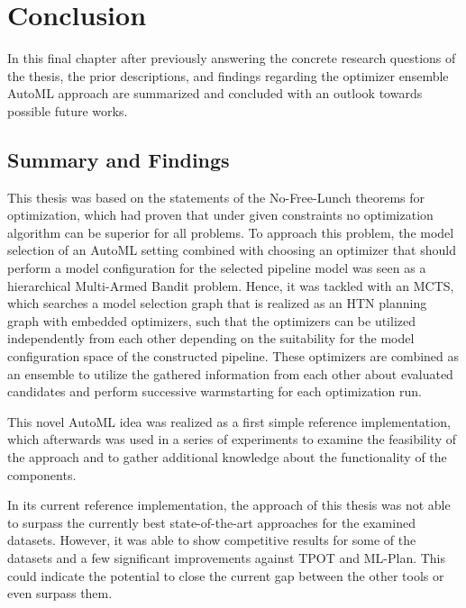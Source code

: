 %
\chapter{Conclusion}
\label{sec:conclusion}
In this final chapter after previously answering the concrete research questions of the thesis, the prior descriptions, and findings regarding the optimizer ensemble AutoML approach are summarized and concluded with an outlook towards possible future works.

\section{Summary and Findings}
\label{sec:conclusion:summary}
This thesis was based on the statements of the No-Free-Lunch theorems for optimization, which had proven that under given constraints no optimization algorithm can be superior for all problems.
To approach this problem, the model selection of an AutoML setting combined with choosing an optimizer that should perform a model configuration for the selected pipeline model was seen as a hierarchical Multi-Armed Bandit problem.
Hence, it was tackled with an MCTS, which searches a model selection graph that is realized as an HTN planning graph with embedded optimizers, such that the optimizers can be utilized independently from each other depending on the suitability for the model configuration space of the constructed pipeline.
These optimizers are combined as an ensemble to utilize the gathered information from each other about evaluated candidates and perform successive warmstarting for each optimization run.

This novel AutoML idea was realized as a first simple reference implementation, which afterwards was used in a series of experiments to examine the feasibility of the approach and to gather additional knowledge about the functionality of the components.

In its current reference implementation, the approach of this thesis was not able to surpass the currently best state-of-the-art approaches for the examined datasets.
However, it was able to show competitive results for some of the datasets and a few significant improvements against TPOT and ML-Plan.
This could indicate the potential to close the current gap between the other tools or even surpass them.

